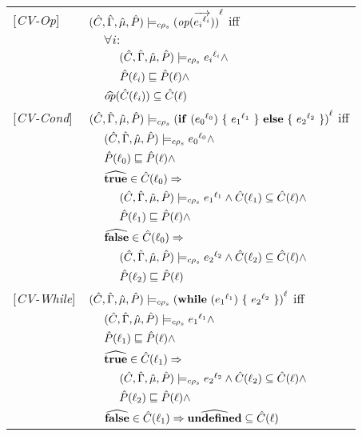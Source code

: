\documentclass[[12pt,a4paper,twoside,openrigh]{report}
\begin{document}
\begin{tabular}{l l l l}
{[\textit{CV-Op}]}&\multicolumn{3}{l}{$ \ccestl {\op (\vec{\lbt i})} $ iff}\\
&&\multicolumn{2}{l}{$\forall i :$}\\
&&&$\ccest {\lbt i} \wedge $\\
&&&$\Pat(\ell_i) \sqsubseteq \Pat(\ell) \wedge$\\
&&\multicolumn{2}{l}{$\widehat{op} (\Cat(\ell_i)) \subseteq \Cat(\ell) $}\\
{[\textit{CV-Cond}]}&\multicolumn{3}{l}{$\ccestl{\cond {\lbt 0} {\lbt 1} {\lbt 2}} $ iff}\\
&&\multicolumn{2}{l}{$ \ccest {\lbt 0} \wedge $}\\
&&\multicolumn{2}{l}{$\Pat(\ell_0) \sqsubseteq \Pat(\ell) \wedge$} \\
&&\multicolumn{2}{l}{$\widehat{\true} \in \Cat(\ell_0) \Rightarrow$}\\
&&&$\ccest {\lbt 1} \wedge \Cat(\ell_1) \subseteq \Cat(\ell)\wedge$\\
&&&$\Pat(\ell_1) \sqsubseteq \Pat(\ell) \wedge$ \\
&&\multicolumn{2}{l}{$\widehat{\false} \in \Cat(\ell_0) \Rightarrow$}\\
&&&$\ccest {\lbt 2} \wedge \Cat(\ell_2) \subseteq \Cat(\ell) \wedge$\\
&&&$\Pat(\ell_2) \sqsubseteq \Pat(\ell)$ \\
{[\textit{CV-While}]}&\multicolumn{3}{l}{$\ccestl {\while {\lbt 1} {\lbt 2}} $ iff}\\
&&\multicolumn{2}{l}{$ \ccest {\lbt 1} \wedge $}\\
&&\multicolumn{2}{l}{$\Pat(\ell_1) \sqsubseteq \Pat(\ell) \wedge$} \\
&&\multicolumn{2}{l}{$\widehat{\true} \in \Cat(\ell_1) \Rightarrow$}\\
&&&$\ccest {\lbt 2} \wedge \Cat(\ell_2) \subseteq \Cat(\ell) \wedge$\\
&&&$ \Pat(\ell_2) \sqsubseteq \Pat(\ell) \wedge$\\
&&\multicolumn{2}{l}{$\widehat{\false} \in \Cat(\ell_1) \Rightarrow \widehat{\undef} \subseteq \Cat(\ell)$}\\
\end{tabular}
\end{document}
